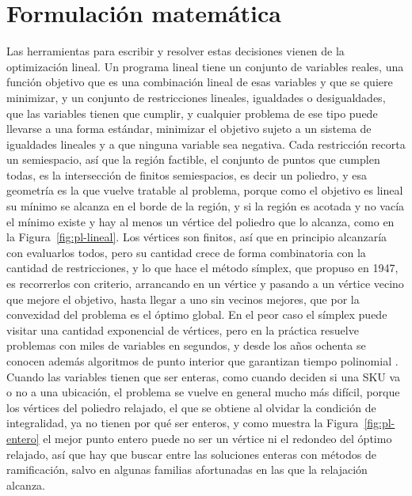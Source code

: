 \section{Formulación matemática}
\label{sec:formulacion}
Las herramientas para escribir y resolver estas decisiones vienen de la optimización lineal.
Un programa lineal tiene un conjunto de variables reales, una función objetivo que es una combinación lineal de esas variables y que se quiere minimizar, y un conjunto de restricciones lineales, igualdades o desigualdades, que las variables tienen que cumplir, y cualquier problema de ese tipo puede llevarse a una forma estándar, minimizar el objetivo sujeto a un sistema de igualdades lineales y a que ninguna variable sea negativa.
Cada restricción recorta un semiespacio, así que la región factible, el conjunto de puntos que cumplen todas, es la intersección de finitos semiespacios, es decir un poliedro, y esa geometría es la que vuelve tratable al problema, porque como el objetivo es lineal su mínimo se alcanza en el borde de la región, y si la región es acotada y no vacía el mínimo existe y hay al menos un vértice del poliedro que lo alcanza, como en la Figura~\ref{fig:pl-lineal}.
Los vértices son finitos, así que en principio alcanzaría con evaluarlos todos, pero su cantidad crece de forma combinatoria con la cantidad de restricciones, y lo que hace el método símplex, que \citet{dantzig1963linear} propuso en 1947, es recorrerlos con criterio, arrancando en un vértice y pasando a un vértice vecino que mejore el objetivo, hasta llegar a uno sin vecinos mejores, que por la convexidad del problema es el óptimo global.
En el peor caso el símplex puede visitar una cantidad exponencial de vértices, pero en la práctica resuelve problemas con miles de variables en segundos, y desde los años ochenta se conocen además algoritmos de punto interior que garantizan tiempo polinomial \citep{karmarkar1984new}.
Cuando las variables tienen que ser enteras, como cuando deciden si una SKU va o no a una ubicación, el problema se vuelve en general mucho más difícil, porque los vértices del poliedro relajado, el que se obtiene al olvidar la condición de integralidad, ya no tienen por qué ser enteros, y como muestra la Figura~\ref{fig:pl-entero} el mejor punto entero puede no ser un vértice ni el redondeo del óptimo relajado, así que hay que buscar entre las soluciones enteras con métodos de ramificación, salvo en algunas familias afortunadas en las que la relajación alcanza.

